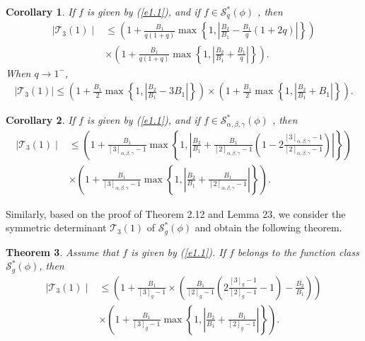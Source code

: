 \documentclass[11pt,twoside, reqno]{article}
\newtheorem{theorem}{Theorem}[section]
\newtheorem{corollary}[theorem]{Corollary}
\theoremstyle{definition}
\begin{document}
\begin{corollary}
If $f$ is given by (\ref{e1.1}), and if $f\in\mathcal{S}^{\ast }_{q}(\phi)$ , then
\begin{align}\nonumber
\mid \mathcal{T}_3(1)\mid &\leq \left(1+\frac{B_{1}}{q(1+q)}\max\left\{1,\left|\frac{B_{2}}{B_{1}}-
\frac{B_{1}}{q}\left(1+2q\right)\right|\right\}\right)\\\nonumber
&\times\left(1+\frac{B_{1}}{q(1+q)}\max\left\{1, \left|\frac{B_{2}}{B_{1}}+\frac{B_{1}}{q}\right|\right\}\right).
\end{align}
When $q\rightarrow1^{-}$,
\begin{align}\nonumber
\mid \mathcal{T}_3(1)\mid \leq \left(1+\frac{B_{1}}{2}\max\left\{1,\left|\frac{B_{2}}{B_{1}}-3
B_{1}\right|\right\}\right)
\times\left(1+\frac{B_{1}}{2}\max\left\{1, \left|\frac{B_{2}}{B_{1}}+B_{1}\right|\right\}\right).
\end{align}
\end{corollary}

\begin{corollary}
If $f$ is given by (\ref{e1.1}),  and if $f\in\mathcal{S}^{\ast }_{\alpha, \beta, \gamma}(\phi)$ , then
\begin{align}\nonumber
\mid \mathcal{T}_3(1)\mid &\leq \left(1+\frac{B_{1}}{[3]_{\alpha, \beta, \gamma}-1}\max\left\{1,\left|\frac{B_{2}}{B_{1}}+
\frac{B_{1}}{[2]_{\alpha, \beta, \gamma}-1}\left(1-2\frac{[3]_{\alpha, \beta, \gamma}-1}{[2]_{\alpha, \beta, \gamma}-1}\right)\right|\right\}\right)\\\nonumber
&\times\left(1+\frac{B_{1}}{[3]_{\alpha, \beta, \gamma}-1}\max\left\{1, \left|\frac{B_{2}}{B_{1}}+\frac{B_{1}}{[2]_{\alpha, \beta, \gamma}-1}\right|\right\}\right).
\end{align}
\end{corollary}
Similarly, based on the proof of Theorem 2.12 and Lemma 23, we consider the symmetric determinant $\mathcal{T}_3(1)$ of $\mathcal{S}^{\ast }_{g}(\phi)$ and obtain the following theorem.

\begin{theorem}
Assume that $f$ is given by (\ref{e1.1}). If $f$ belongs to the function class $\mathcal{S}^{\ast }_{g}(\phi)$, then
\begin{align}\nonumber
\mid \mathcal{T}_3(1)\mid &\leq \left(1+\frac{B_{1}}{[3]_{g}-1}\times\left(\frac{B_{1}}{[2]_{g}-1}\left(2\frac{[3]_{g}-1}{[2]_{g}-1}-1\right)-\frac{B_{2}}{B_{1}}\right)\right)\\\nonumber
&\times\left(1+\frac{B_{1}}{[3]_{g}-1}\max\left\{1, \left|\frac{B_{2}}{B_{1}}+\frac{B_{1}}{[2]_{g}-1}\right|\right\}\right).
\end{align}
\end{theorem}
\end{document}
